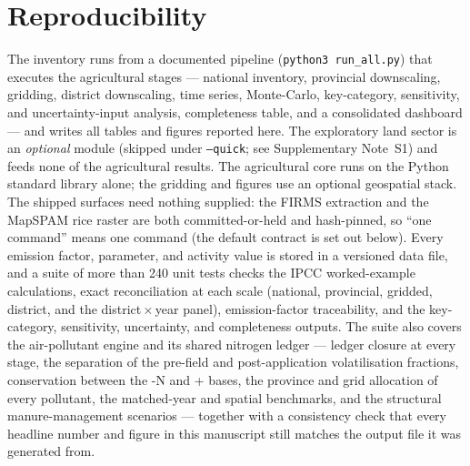 \section{Reproducibility}
\label{app:repro}

The inventory runs from a documented pipeline (\texttt{python3 run\_all.py}) that
executes the agricultural stages --- national inventory, provincial downscaling,
gridding, district downscaling, time series, Monte-Carlo, key-category, sensitivity,
and uncertainty-input analysis, completeness table, and a consolidated dashboard ---
and writes all tables and figures reported here. The exploratory land sector is an
\emph{optional} module (skipped under \texttt{--quick}; see Supplementary Note~S1)
and feeds none of the agricultural results. The agricultural core runs on the Python
standard library alone; the gridding and figures use an optional geospatial stack.
The shipped surfaces need nothing supplied: the FIRMS extraction and the MapSPAM
rice raster are both committed-or-held and hash-pinned, so ``one command'' means
one command (the default contract is set out below). Every emission factor, parameter, and
activity value is stored in a versioned data file, and a suite of more than 240 unit
tests checks the IPCC worked-example calculations, exact reconciliation at each scale
(national, provincial, gridded, district, and the district\,$\times$\,year panel),
emission-factor traceability, and the key-category, sensitivity, uncertainty, and
completeness outputs. The suite also covers the air-pollutant engine and its shared
nitrogen ledger --- ledger closure at every stage, the separation of the pre-field and
post-application volatilisation fractions, conservation between the \NHthree{}-N and
\NHthree{}+\NOx{} bases, the province and grid allocation of every pollutant, the
matched-year and spatial benchmarks, and the structural manure-management scenarios ---
together with a consistency check that every headline number and figure in this
manuscript still matches the output file it was generated from.

